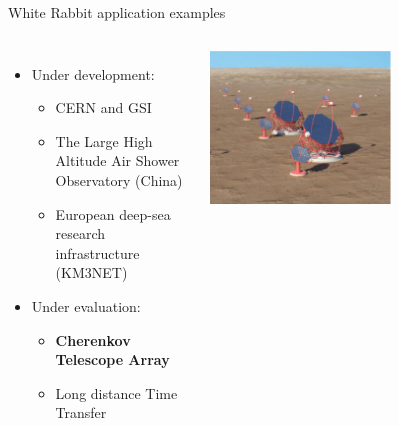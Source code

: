 \documentclass[compress, red]{beamer}
\begin{document}
\begin{frame}{White Rabbit application examples}
\begin{columns}[c]
    \begin{itemize}
      \item Under development:
      \begin{itemize}
	\item CERN and GSI
	\item The Large High Altitude Air Shower Observatory (China)
	\item European deep-sea research infrastructure (KM3NET) 
      \end{itemize}         	
      \item Under evaluation:
      \begin{itemize}
	\item \textbf{Cherenkov Telescope Array}
	\item Long distance Time Transfer
      \end{itemize}         	
    \end{itemize}    
    \begin{center}
      \includegraphics[width=0.6\textwidth]{../../figures/applications/cta.pdf}
      \end{center}
\end{columns}
\end{frame}
\end{document}
